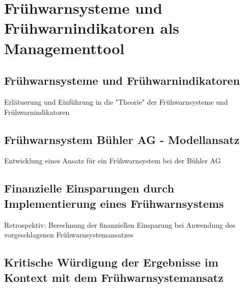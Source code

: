 \section{Frühwarnsysteme und Frühwarnindikatoren als Managementtool}
\subsection{Frühwarnsysteme und Frühwarnindikatoren}
Erlätuerung und Einführung in die "Theorie" der Frühwarnsysteme und Frühwarnindikatoren
\subsection{Frühwarnsystem Bühler AG - Modellansatz}
Entwicklung eines Ansatz für ein Frühwarnsystem bei der Bühler AG
\subsection{Finanzielle Einsparungen durch Implementierung eines Frühwarnsystems}
Retrospektiv: Berechnung der finanziellen Einsparung bei Anwendung des vorgeschlagenen Frühwarnsystemansatzes
\newpage
\subsection{Kritische Würdigung der Ergebnisse im Kontext mit dem Frühwarnsystemansatz}
\newpage